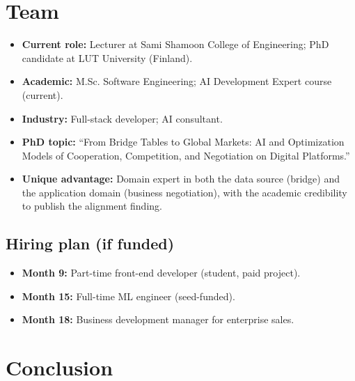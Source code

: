 \documentclass[11pt, a4paper, oneside]{report}
\begin{document}
\chapter{Team}
\label{ch:team}

\begin{keybox}
\begin{itemize}[leftmargin=*,noitemsep]
    \item \textbf{Current role:} Lecturer at Sami Shamoon College of Engineering;
          PhD candidate at LUT University (Finland).
    \item \textbf{Academic:} M.Sc. Software Engineering; AI Development Expert
          course (current).
    \item \textbf{Industry:} Full-stack developer; AI consultant.
    \item \textbf{PhD topic:} ``From Bridge Tables to Global Markets:
          AI and Optimization Models of Cooperation, Competition, and
          Negotiation on Digital Platforms.''
    \item \textbf{Unique advantage:} Domain expert in both the data source
          (bridge) and the application domain (business negotiation),
          with the academic credibility to publish the alignment finding.
\end{itemize}
\end{keybox}

\section{Hiring plan (if funded)}

\begin{itemize}[leftmargin=*]
    \item \textbf{Month 9:} Part-time front-end developer (student, paid project).
    \item \textbf{Month 15:} Full-time ML engineer (seed-funded).
    \item \textbf{Month 18:} Business development manager for enterprise sales.
\end{itemize}

\chapter{Conclusion}
\label{ch:conclusion}
\end{document}
